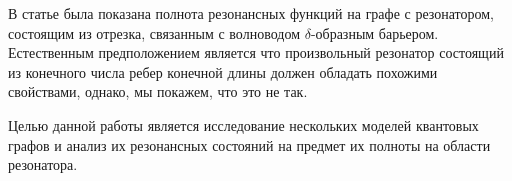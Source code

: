 В статье \cite{popov_exner70} была показана полнота резонансных функций на графе с резонатором, состоящим из отрезка, связанным с волноводом $\delta$-образным барьером. Естественным предположением является что произвольный резонатор состоящий из конечного числа ребер конечной длины должен обладать похожими свойствами, однако, мы покажем, что это не так. 

Целью данной работы является исследование нескольких моделей квантовых графов и анализ их резонансных состояний на предмет их полноты на области резонатора.